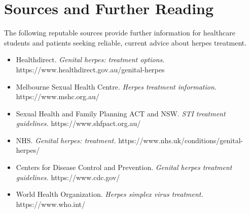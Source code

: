 \section*{Sources and Further Reading}
The following reputable sources provide further information for healthcare students and patients seeking reliable, current advice about herpes treatment.

\begin{itemize}
    \item Healthdirect. \textit{Genital herpes: treatment options.} https://www.healthdirect.gov.au/genital-herpes
    \item Melbourne Sexual Health Centre. \textit{Herpes treatment information.} https://www.mshc.org.au/
    \item Sexual Health and Family Planning ACT and NSW. \textit{STI treatment guidelines.} https://www.shfpact.org.au/
    \item NHS. \textit{Genital herpes: treatment.} https://www.nhs.uk/conditions/genital-herpes/
    \item Centers for Disease Control and Prevention. \textit{Genital herpes treatment guidelines.} https://www.cdc.gov/
    \item World Health Organization. \textit{Herpes simplex virus treatment.} https://www.who.int/
\end{itemize}
